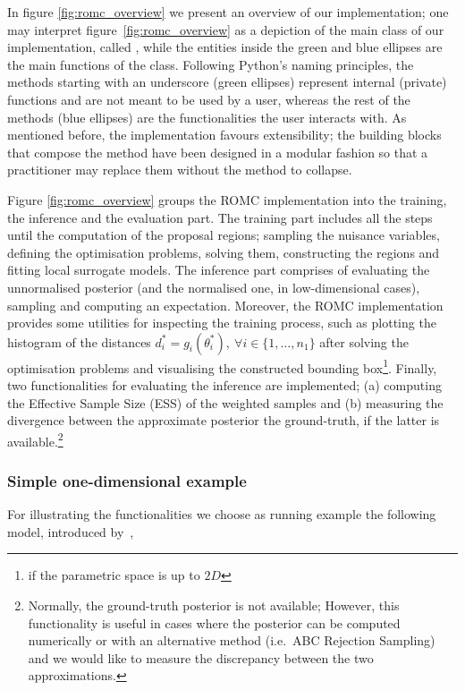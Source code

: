 In figure \ref{fig:romc_overview} we present an overview of our
implementation; one may interpret figure~\ref{fig:romc_overview} as a
depiction of the main class of our implementation, called
, while the entities inside the green and blue
ellipses are the main functions of the class. Following Python's
naming principles, the methods starting with an underscore (green
ellipses) represent internal (private) functions and are not meant to
be used by a user, whereas the rest of the methods (blue ellipses) are
the functionalities the user interacts with. As mentioned before, the
implementation favours extensibility; the building blocks that compose
the method have been designed in a modular fashion so that a
practitioner may replace them without the method to collapse.

Figure \ref{fig:romc_overview} groups the ROMC implementation into the
training, the inference and the evaluation part. The training part includes all the
steps until the computation of the proposal regions; sampling the
nuisance variables, defining the optimisation problems, solving them,
constructing the regions and fitting local surrogate models. The
inference part comprises of evaluating the unnormalised posterior (and
the normalised one, in low-dimensional cases), sampling and computing
an expectation. Moreover, the ROMC implementation provides some
utilities for inspecting the training process, such as plotting the
histogram of the distances
$d^*_i = g_i(\theta_i^*), \: \forall i \in \{1, \ldots, n_1 \}$ after
solving the optimisation problems and visualising the constructed
bounding box\footnote{if the parametric space is up to $2D$}. Finally,
two functionalities for evaluating the inference are implemented; (a)
computing the Effective Sample Size (ESS) of the weighted samples and
(b) measuring the divergence between the approximate posterior the
ground-truth, if the latter is available.\footnote{Normally, the
  ground-truth posterior is not available; However, this functionality
  is useful in cases where the posterior can be computed numerically
  or with an alternative method (i.e.\ ABC Rejection Sampling) and we
  would like to measure the discrepancy between the two
  approximations.}


\subsubsection*{Simple one-dimensional example}

For illustrating the functionalities we choose as running example the
following model, introduced by~\autocite{Ikonomov2019},

